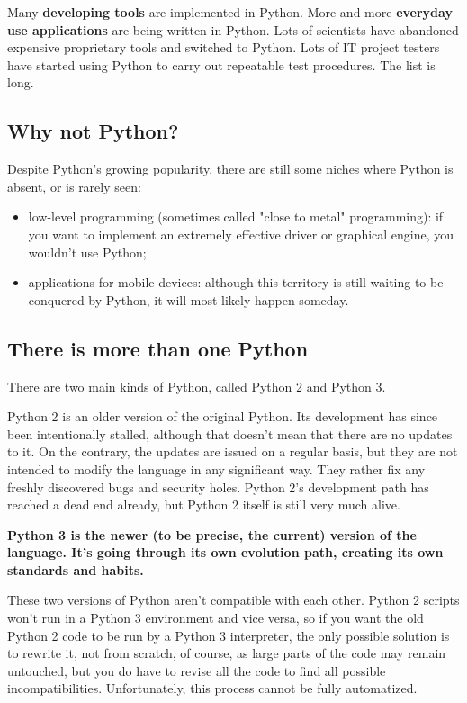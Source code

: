 \documentclass[a4paper,10pt]{article}
\begin{document}
Many \textbf{developing tools} are implemented in Python. More and more \textbf{everyday use applications} are being written in Python. Lots of scientists have abandoned expensive proprietary tools and switched to Python. Lots of IT project testers have started using Python to carry out repeatable test procedures. The list is long.

\subsection{Why not Python?}
Despite Python's growing popularity, there are still some niches where Python is absent, or is rarely seen:
\begin{itemize}
 \item low-level programming (sometimes called "close to metal" programming): if you want to implement an extremely effective driver or graphical engine, you wouldn't use Python;
 \item applications for mobile devices: although this territory is still waiting to be conquered by Python, it will most likely happen someday.
\end{itemize}

\subsection{There is more than one Python}
There are two main kinds of Python, called Python 2 and Python 3.
\newline

Python 2 is an older version of the original Python. Its development has since been intentionally stalled, although that doesn't mean that there are no updates to it. On the contrary, the updates are issued on a regular basis, but they are not intended to modify the language in any significant way. They rather fix any freshly discovered bugs and security holes. Python 2's development path has reached a dead end already, but Python 2 itself is still very much alive.
\newline

\textbf{Python 3 is the newer (to be precise, the current) version of the language. It's going through its own evolution path, creating its own standards and habits.}
\newline

These two versions of Python aren't compatible with each other. Python 2 scripts won't run in a Python 3 environment and vice versa, so if you want the old Python 2 code to be run by a Python 3 interpreter, the only possible solution is to rewrite it, not from scratch, of course, as large parts of the code may remain untouched, but you do have to revise all the code to find all possible incompatibilities. Unfortunately, this process cannot be fully automatized.
\newline
\end{document}
